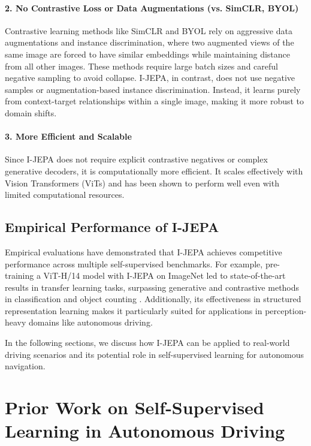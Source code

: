 \documentclass{article}
\begin{document}
\paragraph{2. No Contrastive Loss or Data Augmentations (vs. SimCLR, BYOL)} Contrastive learning methods like SimCLR \citep{chen2020simple} and BYOL \citep{grill2020bootstrap} rely on aggressive data augmentations and instance discrimination, where two augmented views of the same image are forced to have similar embeddings while maintaining distance from all other images. These methods require large batch sizes and careful negative sampling to avoid collapse. I-JEPA, in contrast, does not use negative samples or augmentation-based instance discrimination. Instead, it learns purely from context-target relationships within a single image, making it more robust to domain shifts.

\paragraph{3. More Efficient and Scalable} Since I-JEPA does not require explicit contrastive negatives or complex generative decoders, it is computationally more efficient. It scales effectively with Vision Transformers (ViTs) and has been shown to perform well even with limited computational resources. 

\subsection{Empirical Performance of I-JEPA}
Empirical evaluations have demonstrated that I-JEPA achieves competitive performance across multiple self-supervised benchmarks. For example, pre-training a ViT-H/14 model with I-JEPA on ImageNet led to state-of-the-art results in transfer learning tasks, surpassing generative and contrastive methods in classification and object counting \citep{jean2023ijepa}. Additionally, its effectiveness in structured representation learning makes it particularly suited for applications in perception-heavy domains like autonomous driving.

In the following sections, we discuss how I-JEPA can be applied to real-world driving scenarios and its potential role in self-supervised learning for autonomous navigation.


\section{Prior Work on Self-Supervised Learning in Autonomous Driving}
\end{document}
